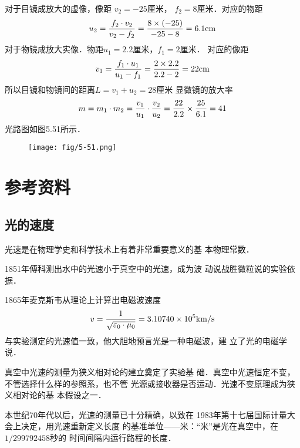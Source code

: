 \begin{enumerate}
\begin{solution}
对于目镜成放大的虚像，像距 $v_2=-25$厘米，
$f_2=8$厘米．对应的物距
\[u_2=\frac{f_2\cdot v_2}{v_2-f_2}=\frac{8\times (-25)}{-25-8}=6.1{\rm cm}\]
对于物镜成放大实像．物距$u_1=2.2$厘米，$f_1=2$厘米．
对应的像距
\[v_1=\frac{f_1\cdot u_1}{u_1-f_1}=\frac{2\times 2.2}{2.2-2}=22{\rm cm}\]
所以目镜和物镜间的距离$L=v_1+u_2=28$厘米
显微镜的放大率
\[m=m_1\cdot m_2=\frac{v_1}{u_1}\cdot \frac{v_2}{u_2}=\frac{22}{2.2}\times\frac{25}{6.1}=41\]
光路图如图5.51所示．
\begin{figure}[htp]
    \centering
    \texttt{[image: fig/5-51.png]}
    \caption{}
\end{figure}
\end{solution}
\end{enumerate}
























\section{参考资料}
\subsection{光的速度}
光速是在物理学史和科学技术上有着非常重要意义的基
本物理常数．

1851年傅科测出水中的光速小于真空中的光速，成为波
动说战胜微粒说的实验依据．

1865年麦克斯韦从理论上计算出电磁波速度
\[v=\frac{1}{\sqrt{\varepsilon_0\cdot \mu_0}}=
3.10740\times10^5{\rm km/s}\]
与实验测定的光速值一致，他大胆地预言光是一种电磁波，建
立了光的电磁学说．

真空中光速的测量为狭义相对论的建立奠定了实验基
础．真空中光速恒定不变，不管选择什么样的参照系，也不管
光源或接收器是否运动．光速不变原理成为狭义相对论的基
本假设之一．

本世纪70年代以后，光速的测量已十分精确，以致在
1983年第十七届国际计量大会上决定，用光速重新定义长度
的基准单位——米：“米”是光在真空中，在$1/299792458$秒的
时间间隔内运行路程的长度．

